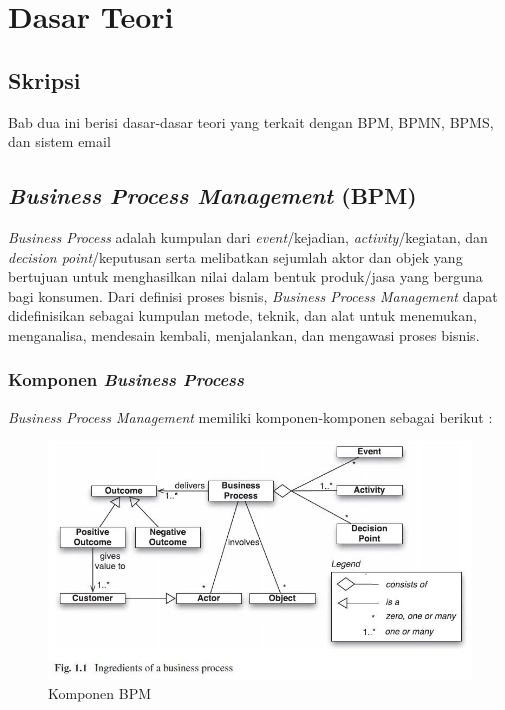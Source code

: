 \chapter{Dasar Teori}
\label{chap:teori}

\section{Skripsi}
\label{sec:skripsi} 
Bab dua ini berisi dasar-dasar teori yang terkait dengan BPM, BPMN, BPMS, dan sistem email




\section{\textit{Business Process Management} (BPM)}
\label{sec:bpm}
\textit{Business Process} adalah kumpulan dari \textit{event}/kejadian, \textit{activity}/kegiatan, dan \textit{decision point}/keputusan serta melibatkan sejumlah aktor dan objek yang bertujuan untuk menghasilkan nilai dalam bentuk produk/jasa yang berguna bagi konsumen. Dari definisi proses bisnis, \textit{Business Process Management} dapat didefinisikan sebagai kumpulan metode, teknik, dan alat untuk menemukan, menganalisa, mendesain kembali, menjalankan, dan mengawasi proses bisnis. 

\subsection{Komponen \textit{Business Process}}
\label{sec:komponenBP}
\textit{Business Process Management} memiliki komponen-komponen sebagai berikut :
\begin{figure}[H]
	\centering
	\includegraphics[scale=0.5]{Gambar/Bab-2/1-bp-components}
	\caption{Komponen BPM} 
	\label{komponenbp}
\end{figure}

